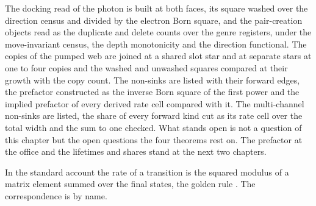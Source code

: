 The docking read of the photon is built at both faces, its square washed over the direction census and divided by the electron Born square, and the pair-creation objects read as the duplicate and delete counts over the genre registers, under the move-invariant census, the depth monotonicity and the direction functional. The copies of the pumped web are joined at a shared slot star and at separate stars at one to four copies and the washed and unwashed squares compared at their growth with the copy count. The non-sinks are listed with their forward edges, the prefactor constructed as the inverse Born square of the first power and the implied prefactor of every derived rate cell compared with it. The multi-channel non-sinks are listed, the share of every forward kind cut as its rate cell over the total width and the sum to one checked. What stands open is not a question of this chapter but the open questions the four theorems rest on. The prefactor at the office and the lifetimes and shares stand at the next two chapters.
\begin{chbridge}
In the standard account the rate of a transition is the squared modulus of a matrix element summed over the final states, the golden rule \cite{Dirac1927}. The correspondence is by name.
\end{chbridge}
